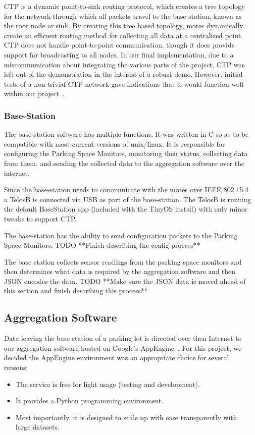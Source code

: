\documentclass{acm_proc}
\begin{document}
CTP is a dynamic point-to-sink routing protocol, which creates a tree
topology for the network through which all packets travel to the base
station, known as the root node or sink.  By creating this tree based
topology, motes dynamically create an efficient routing method for
collecting all data at a centralized point.  CTP does not handle
point-to-point communication, though it does provide support for
broadcasting to all nodes.  In our final implementation, due to a
miscommunication about integrating the various parts of the project, CTP
was left out of the demonstration in the interest of a robust demo.
However, initial tests of a non-trivial CTP network gave indications that
it would function well within our
project~\cite{tep123:collection-tree-protocol}.

\subsubsection{Base-Station}

The base-station software has multiple functions.  It was written in C so as to be compatible with most current versions of unix/linux.  It is responsible for configuring the Parking Space Monitors, monitoring their status, collecting data from them, and sending the collected data to the aggregation software over the internet.

Since the base-station needs to communicate with the motes over IEEE
802.15.4 a TelosB is connected via USB as part of the base-station.  The
TelosB is running the default BaseStation app (included with the TinyOS
install) with only minor tweaks to support CTP.

The base-station has the ability to send configuration packets to the
Parking Space Monitors.  TODO **Finish describing the config process**

The base station collects sensor readings from the parking space monitors
and then determines what data is required by the aggregation software and
then JSON encodes the data.  TODO **Make sure the JSON data is moved ahead
of this section and finish describing this process**


\subsection{Aggregation Software}

Data leaving the base station of a parking lot is directed over then
Internet to our aggregation software hosted on Google's
AppEngine~\cite{google:appengine}.
For this project, we decided the AppEngine environment was an appropriate
choice for several reasons:
\begin{itemize}
	\item The service is free for light usage (testing and development).
	\item It provides a Python programming environment.
	\item Most importantly, it is designed to scale up with ease
	transparently with large datasets.
\end{itemize}
\end{document}
